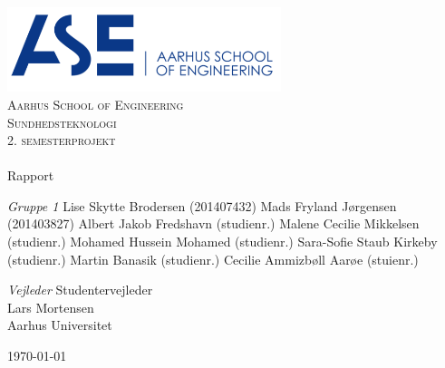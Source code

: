 \begin{titlingpage}
\begin{center}

~ \\[3cm]

\includegraphics[width=0.6\textwidth]{figurer/ASE.png}~\\[1cm]

\textsc{\LARGE Aarhus School of Engineering}\\[1.5cm]

\textsc{\Large Sundhedsteknologi}\\
\textsc{\Large 2. semesterprojekt}\\[0.5cm]

\noindent\makebox[\linewidth]{\rule{\textwidth}{0.4pt}}\\
[0.5cm]{\Huge Rapport}
\noindent\makebox[\linewidth]{\rule{\textwidth}{0.4pt}}

\end{center}

\textit{Gruppe 1} \newline
Lise Skytte Brodersen (201407432) \newline
Mads Fryland J\o rgensen (201403827) \newline
Albert Jakob Fredshavn (studienr.) \newline
Malene Cecilie Mikkelsen (studienr.) \newline		 
Mohamed Hussein Mohamed (studienr.) \newline 
Sara-Sofie Staub Kirkeby (studienr.) \newline
Martin Banasik (studienr.) \newline
Cecilie Ammizb\o ll Aar\o e (stuienr.) \newline 


\textit{Vejleder} \newline
Studentervejleder\\
Lars Mortensen\\
Aarhus Universitet


\vfill

\begin{center}
{\large \today}
\end{center}


\end{titlingpage}